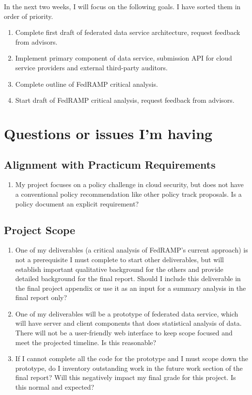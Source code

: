 \documentclass{jdf}
\begin{document}
In the next two weeks, I will focus on the following goals. I have sorted them in order of priority.

\begin{enumerate}
    \item Complete first draft of federated data service architecture, request feedback from advisors.
    \item Implement primary component of data service, submission API for cloud service providers and external third-party auditors.
    \item Complete outline of FedRAMP critical analysis.
    \item Start draft of FedRAMP critical analysis, request feedback from advisors.
\end{enumerate}

\section*{Questions or issues I'm having}

\subsection*{Alignment with Practicum Requirements}

\begin{enumerate}
    \item My project focuses on a policy challenge in cloud security, but does not have a conventional policy recommendation like other policy track proposals. Is a policy document an explicit requirement?
\end{enumerate}

\subsection*{Project Scope}

\begin{enumerate}
    \item One of my deliverables (a critical analysis of FedRAMP's current approach) is not a prerequisite I must complete to start other deliverables, but will establish important qualitative background for the others and provide detailed background for the final report. Should I include this deliverable in the final project appendix or use it as an input for a summary analysis in the final report only?
    \item One of my deliverables will be a prototype of federated data service, which will have server and client components that does statistical analysis of data. There will not be a user-friendly web interface to keep scope focused and meet the projected timeline. Is this reasonable?
    \item If I cannot complete all the code for the prototype and I must scope down the prototype, do I inventory outstanding work in the future work section of the final report? Will this negatively impact my final grade for this project. Is this normal and expected?
\end{enumerate}
\end{document}
